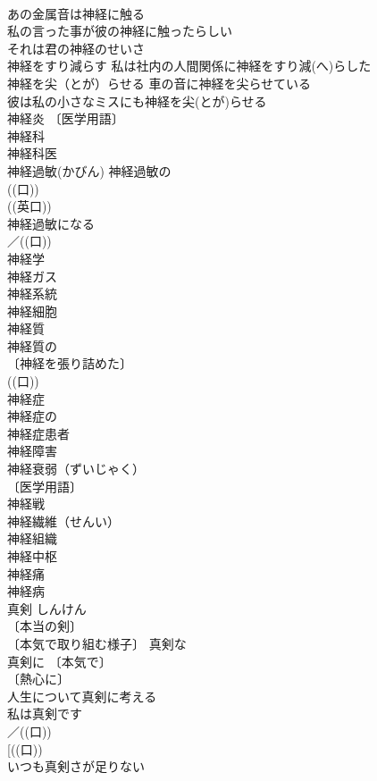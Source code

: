 \documentclass[8pt]{extreport}
\begin{document}
\begin{CJK}{UTF8}{min}
\\	あの金属音は神経に触る 
\\	私の言った事が彼の神経に触ったらしい 
\\	それは君の神経のせいさ 
\\	神経をすり減らす 私は社内の人間関係に神経をすり減(へ)らした 
\\	神経を尖（とが）らせる 車の音に神経を尖らせている 
\\	彼は私の小さなミスにも神経を尖(とが)らせる 
\\	神経炎 〔医学用語〕
\\	神経科 
\\	神経科医 
\\	神経過敏(かびん) 神経過敏の 
\\	((口)) 
\\	((英口)) 
\\	神経過敏になる 
\\	／((口)) 
\\	神経学 
\\	神経ガス 
\\	神経系統 
\\	神経細胞 
\\	神経質 
\\	神経質の 
\\	〔神経を張り詰めた〕
\\	((口)) 
\\	神経症 
\\	神経症の 
\\	神経症患者 
\\	神経障害 
\\	神経衰弱（ずいじゃく） 
\\	〔医学用語〕
\\	神経戦 
\\	神経繊維（せんい） 
\\	神経組織 
\\	神経中枢 
\\	神経痛 
\\	神経病 
\\	真剣	しんけん	
\\	〔本当の剣〕
\\	〔本気で取り組む様子〕 真剣な 
\\	真剣に 〔本気で〕
\\	〔熱心に〕
\\	人生について真剣に考える 
\\	私は真剣です 
\\	／((口))
\\	[((口)) 
\\	いつも真剣さが足りない 

\end{CJK}
\end{document}
